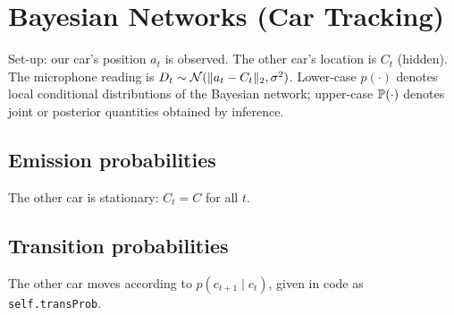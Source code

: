 \section{Bayesian Networks (Car Tracking)}
\label{sec:bayesian}

Set-up: our car's position $a_t$ is observed. The other car's location is $C_t$ (hidden). The microphone reading
is $D_t\sim\mathcal N(\norm{a_t-C_t},\sigma^2)$. Lower-case $p(\cdot)$ denotes local conditional distributions
of the Bayesian network; upper-case $\P(\cdot)$ denotes joint or posterior quantities obtained by inference.

\subsection{Emission probabilities}
The other car is stationary: $C_t=C$ for all $t$.

\begin{solution}
\end{solution}

\begin{solution}
\end{solution}


\subsection{Transition probabilities}
The other car moves according to $p(c_{t+1}\mid c_t)$, given in code as \texttt{self.transProb}.

